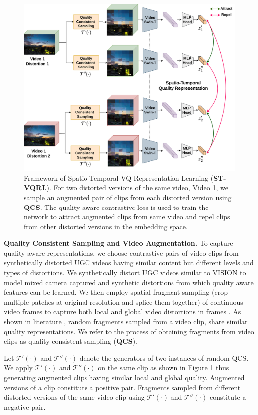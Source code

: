 \documentclass[10pt,twocolumn,letterpaper]{article}
\begin{document}
\begin{figure}
\begin{center}
\includegraphics[width=0.9\columnwidth, keepaspectratio]{figures/stvql.png}
\end{center}
\caption{Framework of  Spatio-Temporal VQ Representation Learning (\textbf{ST-VQRL}). For two distorted versions of the same video, Video 1, we sample an augmented pair of clips from each distorted version using \textbf{QCS}.  The quality aware contrastive loss is used to train the network to attract augmented clips from same video and repel clips from other distorted versions in the embedding space. }
\label{fig:stvqrl_framework}
\end{figure}

\textbf{Quality Consistent Sampling and Video Augmentation.} To capture quality-aware representations, we choose contrastive pairs of video clips from synthetically distorted UGC videos having similar content but different levels and types of distortions. We synthetically distort UGC videos similar to VISION \cite{vision} to model mixed camera captured and synthetic distortions from which quality aware features can be learned. We then employ spatial fragment sampling (crop multiple patches at original resolution and splice them together) of continuous video frames to capture both local and global video distortions in frames \cite{fastVQA}. 
As shown in literature \cite{fastVQA, maxVQA}, random fragments sampled from a video clip, share similar quality representations. We refer to the process of obtaining fragments from video clips as quality consistent sampling (\textbf{QCS}). 

Let $\mathcal{T}'(\cdot)$ and $\mathcal{T}''(\cdot)$ denote the generators of two instances of random QCS. We apply $\mathcal{T}'(\cdot)$ and $\mathcal{T}''(\cdot)$  on the same clip as shown in Figure \ref{fig:stvqrl_framework} thus generating augmented clips having similar local and global quality.  
Augmented versions of a clip constitute a positive pair. Fragments sampled from different distorted versions of the same video clip using $\mathcal{T}'(\cdot)$ and $\mathcal{T}''(\cdot)$ constitute a negative pair.
\end{document}

